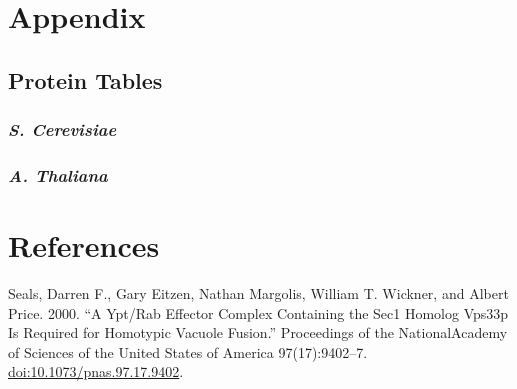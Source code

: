 \documentclass[12pt,twoside]{reedthesis}
\begin{document}
\chapter*{Appendix}\label{appendix}

\section*{Protein Tables}\label{protein-tables}

\subsection*{\texorpdfstring{\emph{S. Cerevisiae}}{S. Cerevisiae}}\label{s.-cerevisiae}

\subsection*{\texorpdfstring{\emph{A. Thaliana}}{A. Thaliana}}\label{a.-thaliana}

\backmatter

\chapter*{References}\label{references}


\noindent 

\setlength{\parindent}{-0.20in}

Seals, Darren F., Gary Eitzen, Nathan Margolis, William T. Wickner, and Albert Price. 2000. ``A Ypt/Rab Effector Complex Containing the Sec1 Homolog Vps33p Is Required for Homotypic Vacuole Fusion.'' Proceedings of the NationalAcademy of Sciences of the United States of America 97(17):9402--7. \url{doi:10.1073/pnas.97.17.9402}.


\end{document}
